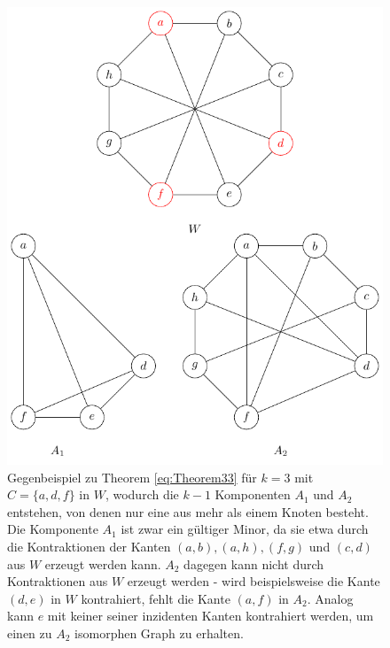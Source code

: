 \begin{figure}[H]
  \centering
  \includegraphics[keepaspectratio]{bilder/Theorem33.pdf}
  \caption{Gegenbeispiel zu Theorem \ref{eq:Theorem33} für  $k=3$ mit $C=\{a, d, f\}$ in $W$, wodurch die $k-1$ Komponenten $A_1$ und $A_2$ entstehen, von denen nur eine aus mehr als einem Knoten besteht.
           Die Komponente $A_1$ ist zwar ein gültiger Minor, da sie etwa durch die Kontraktionen der Kanten $(a, b), (a, h), (f, g)$ und $(c, d)$ aus $W$ erzeugt werden kann.
           $A_2$ dagegen kann nicht durch Kontraktionen aus $W$ erzeugt werden - wird beispielsweise die Kante $(d, e)$ in $W$ kontrahiert, fehlt die Kante $(a, f)$ in $A_2$.
           Analog kann $e$ mit keiner seiner inzidenten Kanten kontrahiert werden, um einen zu $A_2$ isomorphen Graph zu erhalten.}
  \label{fig:Theorem33}
\end{figure}


